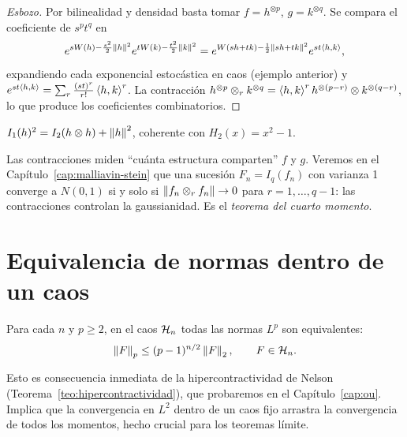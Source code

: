 \begin{proof}[Esbozo]
Por bilinealidad y densidad basta tomar $f=h^{\otimes p}$, $g=k^{\otimes q}$. Se compara el coeficiente
de $s^pt^q$ en
\[
  e^{sW(h)-\frac{s^2}{2}\left\lVert h\right\rVert^2}e^{tW(k)-\frac{t^2}{2}\left\lVert k\right\rVert^2}=e^{W(sh+tk)-\frac12\left\lVert sh+tk\right\rVert^2}e^{st\left\langle h, k\right\rangle},
\]
expandiendo cada exponencial estocástica en caos (ejemplo anterior) y $e^{st\left\langle h, k\right\rangle}=\sum_r\frac{(st)^r}{r!}\left\langle h, k\right\rangle^r$.
La contracción $h^{\otimes p}\otimes_rk^{\otimes q}=\left\langle h, k\right\rangle^rh^{\otimes(p-r)}\otimes k^{\otimes(q-r)}$, lo que produce los coeficientes combinatorios.
\end{proof}

\begin{ejemplo}
$I_1(h)^2=I_2(h\otimes h)+\left\lVert h\right\rVert^2$, coherente con $H_2(x)=x^2-1$.
\end{ejemplo}

\begin{intuicion}
Las contracciones miden ``cuánta estructura comparten'' $f$ y $g$. Veremos en el Capítulo~\ref{cap:malliavin-stein}
que una sucesión $F_n=I_q(f_n)$ con varianza 1 converge a $N(0,1)$ si y solo si $\left\lVert f_n\otimes_rf_n\right\rVert\to0$
para $r=1,\dots,q-1$: las contracciones controlan la gaussianidad. Es el \emph{teorema del
cuarto momento}.
\end{intuicion}

\section{Equivalencia de normas dentro de un caos}

\begin{teorema}\label{teo:normas-caos}
Para cada $n$ y $p\ge2$, en el caos $\mathcal{H}_n$ todas las normas $L^p$ son equivalentes:
\[
  \left\lVert F\right\rVert_p\le(p-1)^{n/2}\left\lVert F\right\rVert_2,\qquad F\in\mathcal{H}_n.
\]
\end{teorema}

Esto es consecuencia inmediata de la hipercontractividad de Nelson (Teorema~\ref{teo:hipercontractividad}), que
probaremos en el Capítulo~\ref{cap:ou}. Implica que la convergencia en $L^2$ dentro de un caos fijo arrastra
la convergencia de todos los momentos, hecho crucial para los teoremas límite.
